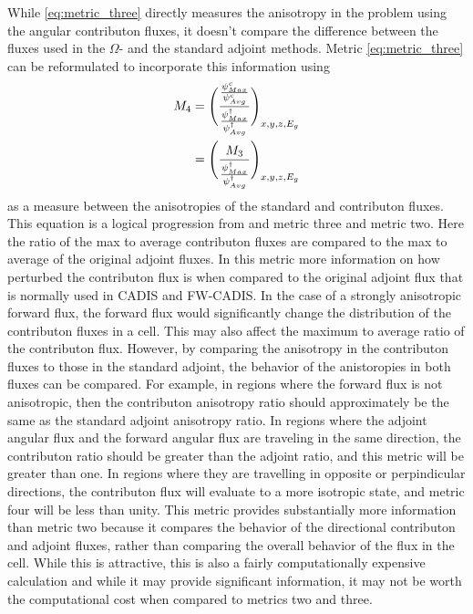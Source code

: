 While \ref{eq:metric_three} directly measures the anisotropy in the problem using
the angular contributon fluxes, it doesn't compare the difference
between the fluxes used
in the $\Omega$-  and the standard adjoint methods. Metric \ref{eq:metric_three}
can be
reformulated to incorporate this information using
%
\begin{equation}
  \begin{split}
    M_{4} & = \Bigg( \frac{\frac{\psi^{c}_{Max}}{\psi^{c}_{
                  Avg}}}{\frac{\psi^{\dagger}_{
                  Max}}{\psi^{\dagger}_{Avg}}} \Bigg)_{x,y,z,E_g} \\
          & = \Bigg(\frac{M_{3}}{\frac{\psi^{\dagger}_{Max}}
                  {\psi^{\dagger}_{Avg}}} \Bigg)_{x,y,z,E_g}
  \end{split}
  \label{eq:metric_four}
\end{equation}
%
as a measure between the anisotropies of the standard and contributon fluxes.
This equation is a logical progression from and metric three and
metric two. Here the ratio
of the max to average contributon fluxes are compared to the max to average of the
original adjoint fluxes. In this metric more information on how perturbed the
contributon flux is when compared to the original adjoint flux that is normally
used in CADIS and FW-CADIS.
In the case of a strongly anisotropic
forward flux, the forward flux  would significantly
change the distribution of the contributon
fluxes in a cell. This may also affect the maximum to average ratio
of the contributon flux. However, by comparing the anisotropy in the contributon
fluxes to those in the standard adjoint, the behavior of the anistoropies in
both fluxes can be compared. For example, in regions where the forward flux is
not anisotropic, then the contributon anisotropy ratio should approximately be
the same as the standard adjoint anisotropy ratio. In regions where the adjoint
angular flux and the forward angular flux are traveling in the same direction,
the contributon ratio should be greater than the adjoint ratio, and this metric
will be greater than one. In regions where they are travelling in opposite or
perpindicular directions, the contributon flux will evaluate to a more isotropic
state, and metric four will be less than unity. This metric
provides substantially more information than metric two because
it compares the behavior of the directional contributon and adjoint fluxes,
rather than comparing the overall behavior of the flux in the cell.
While this is attractive, this is also a fairly computationally
expensive calculation and while it may provide significant information, it may
not be worth the computational cost when compared to metrics two and three.

